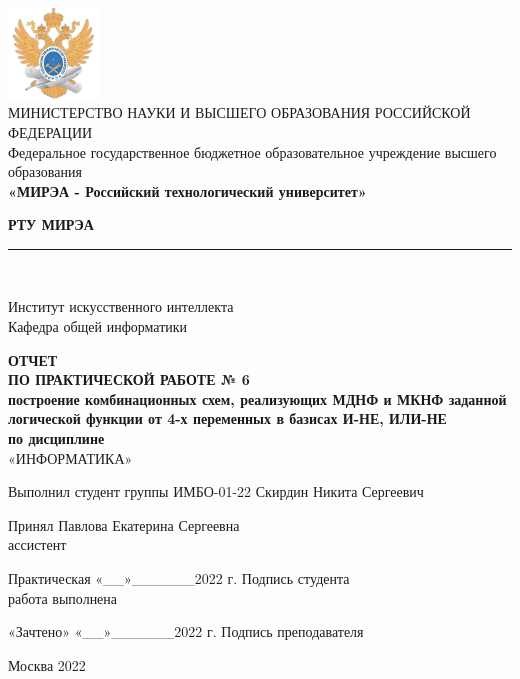 \documentclass[14pt, a4paper]{extreport}
\newcommand{\doublerule}[1][.4pt]{%
	\noindent
	\makebox[0pt][l]{\rule[.6ex]{\linewidth}{#1}}%
	\rule[.3ex]{\linewidth}{#1}
}
\begin{document}
\begin{titlepage}
	\begin{center}
		\vspace*{0.5mm}

		\includegraphics[width=0.18\textwidth]{logo}\\
		\footnotesize
		МИНИСТЕРСТВО НАУКИ И ВЫСШЕГО ОБРАЗОВАНИЯ РОССИЙСКОЙ ФЕДЕРАЦИИ\\
		\small
		Федеральное государственное бюджетное образовательное учреждение высшего образования\\
		\textbf{«МИРЭА - Российский технологический университет»}
		\vspace{0.5cm}

		\large \textbf{РТУ МИРЭА} \normalsize

		\doublerule[1pt]\\
		\vspace{0.4cm}

		Институт искусственного интеллекта\\
		Кафедра общей информатики
		\vspace{1.5cm}

		\textbf{ОТЧЕТ}\\
		\textbf{ПО ПРАКТИЧЕСКОЙ РАБОТЕ № 6}\\
		\textbf{построение комбинационных схем, реализующих МДНФ и МКНФ заданной логической функции от 4-х переменных в базисах И-НЕ, ИЛИ-НЕ}\\
		\textbf{по дисциплине}\\
		«ИНФОРМАТИКА»
		\vspace{1.5cm}

		\small
		Выполнил студент группы ИМБО-01-22 \hfill Скирдин Никита Сергеевич
		\vspace{1cm}

		Принял \hfill Павлова Екатерина Сергеевна\\
		ассистент \hfill
		\vspace{1.5cm}

		\footnotesize
		\hspace{0.5cm} Практическая \hfill «\_\_»\_\_\_\_\_\_2022 г. \hfill Подпись студента\\
		\hspace{0.5cm} работа выполнена \hfill
		\vspace{0.5cm}

		\hspace{2cm} «Зачтено» \hfill «\_\_»\_\_\_\_\_\_2022 г. \hfill Подпись преподавателя
		\vfill

		\small
		Москва 2022
	\end{center}
	\thispagestyle{empty}
\end{titlepage}
\end{document}

